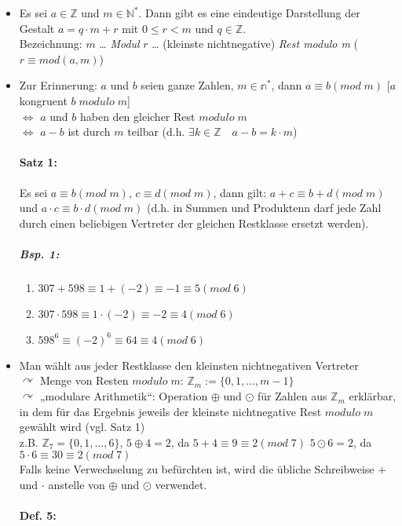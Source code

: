 \begin{itemize}
\item Es sei $a \in \mathbb{Z}$ und $m\in\mathbb{N}^*$. Dann gibt es eine eindeutige Darstellung der Gestalt $\boxed{a=q\cdot m + r}$ mit $\boxed{0\leq r < m}$ und $q \in \mathbb{Z}$.\\
Bezeichnung: $m$ … \emph{Modul} \qquad $r$ … (kleinste nichtnegative) \emph{Rest modulo m} ($r \equiv mod (a,m)$)
\item Zur Erinnerung: $a$ und $b$ seien ganze Zahlen, $m\in \mathbb{n}^*$, dann $a\equiv b (mod\; m)$ [$a$ kongruent $b\; modulo\; m$]\\
$\Leftrightarrow$ $a$ und $b$ haben den gleicher Rest $modulo\; m$\\
$\Leftrightarrow$ $a-b$ ist durch $m$ teilbar (d.h. $\exists k \in \mathbb{Z} \quad a-b = k\cdot m$)
\paragraph{Satz 1:} \parskp
Es sei $a \equiv b (mod\; m)$, $c\equiv d (mod\; m)$, dann gilt: $a+c \equiv b+d (mod \;m)$ und $a\cdot c \equiv b \cdot d (mod\; m)$ (d.h. in Summen und Produktenn darf jede Zahl durch einen beliebigen Vertreter der gleichen Restklasse ersetzt werden).
\subparagraph{Bsp. 1:} 
\begin{enumerate}[label=\alph*)]
\item $307+598 \equiv 1+(-2)\equiv -1 \equiv 5 (mod \; 6)$
\item $307\cdot 598 \equiv 1 \cdot (-2) \equiv -2 \equiv 4 (mod \; 6)$
\item $598^6 \equiv (-2)^6\equiv 64 \equiv 4 (mod \; 6)$
\end{enumerate}
\item Man wählt aus jeder Restklasse den kleinsten nichtnegativen Vertreter \\
$\curvearrowright$ Menge von Resten $modulo \; m$: $\mathbb{Z}_m:= \{0,1,...,m-1\}$ \\
$\curvearrowright$ „modulare Arithmetik“: Operation $\oplus$ und $\odot$ für Zahlen aus $\mathbb{Z}_m$ erklärbar, in dem für das Ergebnis jeweils der kleinste nichtnegative Rest $modulo \; m$ gewählt wird (vgl. Satz 1)\\
z.B. $\mathbb{Z}_7 = \{ 0,1,..., 6\}$, \quad $5\oplus 4=2$, da $5+4\equiv 9\equiv 2 (mod \; 7)$ \quad $5\odot 6=2$, da $5\cdot 6\equiv 30 \equiv 2 (mod \;7)$\smallskip\\
Falls keine Verwechselung zu befürchten ist, wird die übliche Schreibweise $+$ und $\cdot$ anstelle von $\oplus$ und $\odot$ verwendet.
\paragraph{Def. 5:} 
\end{itemize}








